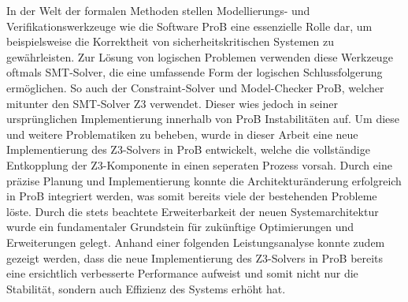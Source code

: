 
In der Welt der formalen Methoden stellen Modellierungs- und Verifikationswerkzeuge wie die Software ProB eine essenzielle Rolle dar,
um beispielsweise die Korrektheit von sicherheitskritischen Systemen zu gewährleisten.
Zur Lösung von logischen Problemen verwenden diese Werkzeuge oftmals SMT-Solver, die eine umfassende Form der logischen Schlussfolgerung ermöglichen.
So auch der Constraint-Solver und Model-Checker ProB, welcher mitunter den SMT-Solver Z3 verwendet.
Dieser wies jedoch in seiner ursprünglichen Implementierung innerhalb von ProB Instabilitäten auf.
Um diese und weitere Problematiken zu beheben, wurde in dieser Arbeit eine neue Implementierung des Z3-Solvers in ProB entwickelt, welche
die vollständige Entkopplung der Z3-Komponente in einen seperaten Prozess vorsah.
Durch eine präzise Planung und Implementierung konnte die Architekturänderung erfolgreich in ProB integriert werden, was somit bereits viele der bestehenden Probleme löste.
Durch die stets beachtete Erweiterbarkeit der neuen Systemarchitektur wurde ein fundamentaler Grundstein für zukünftige Optimierungen und Erweiterungen gelegt.
Anhand einer folgenden Leistungsanalyse konnte zudem gezeigt werden, dass die neue Implementierung des Z3-Solvers
in ProB bereits eine ersichtlich verbesserte Performance aufweist und somit nicht nur die Stabilität, sondern auch Effizienz des Systems erhöht hat.
